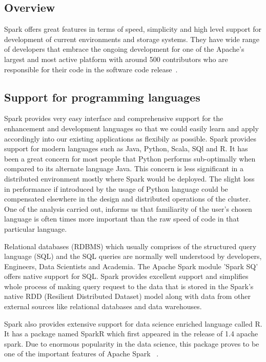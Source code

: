 \subsection{Overview}
Spark offers great features in terms of speed, simplicity and high level support
 for development of current environments and storage systems. They have wide 
 range of developers that embrace the ongoing development for one of the 
 Apache's largest and most active platform with around 500 contributors who are 
 responsible for their code in the software code release~\cite{hid-sp18-410-spark-architecture}.

\subsection{Support for programming languages}
Spark provides very easy interface and comprehensive support for the enhancement
 and development languages so that we could easily learn and apply accordingly 
 into our existing applications as flexibily as possible.
Spark provides support for modern languages such as Java, Python, Scala, SQl and
 R. It has been a great concern for most people that Python performs 
 sub-optimally when compared to its alternate language Java. This concern is 
 less significant in a distributed environment mostly where Spark would be 
 deployed. The slight loss in performance if introduced by the usage of Python 
 language could be compensated elsewhere in the design and distributed 
 operations of the cluster. One of the analysis carried out, informs us that 
 familiarity of the user's chosen language is often times more important than 
 the raw speed of code in that particular language.

Relational databases (RDBMS) which usually comprises of the structured query 
language (SQL) and the SQL queries are normally well understood by developers, 
Engineers, Data Scientists and Academia. The Apache Spark module 'Spark SQ' 
offers native support for SQL. Spark provides excellent support and simplifies 
whole process of making query request to the data that is stored in the Spark's 
native RDD (Resilient Distributed Dataset) model along with data from other 
external sources like relational databases and data warehouses.
 
Spark also provides extensive support for data science enriched language called 
R. It has a package named SparkR which first appeared in the release of 1.4 
apache spark. Due to enormous popularity in the data science, this package 
proves to be one of the important features of Apache Spark
~\cite{hid-sp18-410-spark-architecture}.

